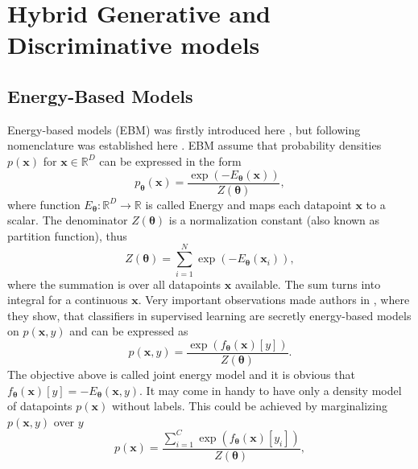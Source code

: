 \chapter{Hybrid Generative and Discriminative models}

\section{Energy-Based Models}\label{EBM}
Energy-based models (EBM) was firstly introduced here \cite{energy}, but following nomenclature was established here \cite{energy2}. EBM assume that probability densities $p(\boldsymbol{x})$ for $\boldsymbol{x} \in \mathbb{R}^D$ can be expressed in the form
\begin{equation}
	p_{\boldsymbol{\theta}}\left(\boldsymbol{x}\right) = \frac{\exp\left(-E_{\boldsymbol{\theta}}(\boldsymbol{x})\right)}{Z(\boldsymbol{\theta})},
\end{equation}
where function $E_{\boldsymbol{\theta}} : \mathbb{R}^D \to \mathbb{R}$ is called Energy and maps each datapoint $\boldsymbol{x}$ to a scalar. The denominator $Z(\boldsymbol{\theta})$ is a normalization constant (also known as partition function), thus
\begin{equation}
	Z(\boldsymbol{\theta}) = \sum_{i=1}^N \exp\left(-E_{\boldsymbol{\theta}}(\boldsymbol{x}_i)\right),
\end{equation}
where  the summation is over all datapoints $\boldsymbol{x}$ available. The sum turns into integral for a continuous $\boldsymbol{x}$.   Very important observations made authors in \cite{energy2}, where they show, that classifiers in supervised learning are secretly energy-based models on $p(\boldsymbol{x},y)$ and can be expressed as
\begin{equation}
	p\left(\boldsymbol{x},y\right) = \frac{\exp\left({f_{\boldsymbol{\theta}}\left(\boldsymbol{x}\right)[y]}\right)}{Z(\boldsymbol{\theta})}.
\end{equation}
The objective above is called joint energy model and it is obvious that $f_{\boldsymbol{\theta}}\left(\boldsymbol{x}\right)[y] = -E_{\boldsymbol{\theta}}(\boldsymbol{x},y)$. It may come in handy to have only a density model of datapoints $p(\boldsymbol{x})$ without labels. This could be achieved by marginalizing $p(\boldsymbol{x},y)$ over $y$ 
\begin{equation}
	p\left(\boldsymbol{x}\right) = \frac{\sum_{i=1}^C\exp\left({f_{\boldsymbol{\theta}}\left(\boldsymbol{x}\right)[y_i]}\right)}{Z(\boldsymbol{\theta})},
\end{equation}
